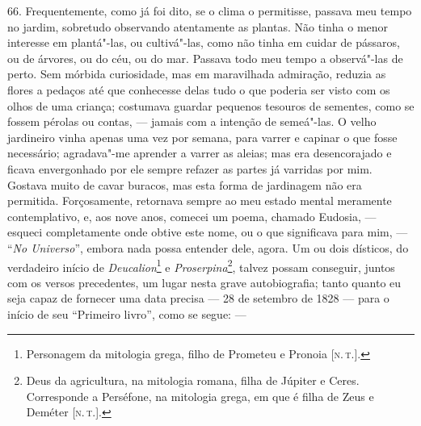 66. Frequentemente, como já foi dito, se o clima o permitisse, passava
meu tempo no jardim, sobretudo observando atentamente as plantas. Não
tinha o menor interesse em plantá"-las, ou cultivá"-las, como não tinha em
cuidar de pássaros, ou de árvores, ou do céu, ou do mar. Passava todo
meu tempo a observá"-las de perto. Sem mórbida curiosidade, mas em
maravilhada admiração, reduzia as flores a pedaços até que conhecesse
delas tudo o que poderia ser visto com os olhos de uma criança;
costumava guardar pequenos tesouros de sementes, como se fossem pérolas
ou contas, --- jamais com a intenção de semeá"-las. O velho jardineiro
vinha apenas uma vez por semana, para varrer e capinar o que fosse
necessário; agradava"-me aprender a varrer as aleias; mas era
desencorajado e ficava envergonhado por ele sempre refazer as partes já
varridas por mim. Gostava muito de cavar buracos, mas esta forma de
jardinagem não era permitida. Forçosamente, retornava sempre ao meu
estado mental meramente contemplativo, e, aos nove anos, comecei um
poema, chamado Eudosia, --- esqueci completamente onde obtive este nome,
ou o que significava para mim, --- ``\emph{No Universo}'', embora nada
possa entender dele, agora. Um ou dois dísticos, do verdadeiro início de
\emph{Deucalion}\footnote{Personagem da mitologia grega, filho de
  Prometeu e Pronoia {[}\textsc{n.\,t.}{]}.} e \emph{Proserpina}\footnote{Deus
  da agricultura, na mitologia romana, filha de Júpiter e Ceres.
  Corresponde a Perséfone, na mitologia grega, em que é filha de Zeus e
  Deméter {[}\textsc{n.\,t.}{]}.}, talvez possam conseguir, juntos com os
versos precedentes, um lugar nesta grave autobiografia; tanto quanto eu
seja capaz de fornecer uma data precisa --- 28 de setembro de 1828 ---
para o início de seu ``Primeiro livro'', como se segue: ---

